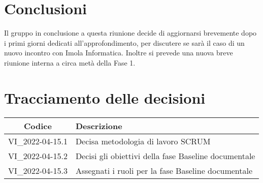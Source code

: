 \section{Conclusioni}
Il gruppo in conclusione a questa riunione decide di aggiornarsi brevemente dopo i primi giorni dedicati all'approfondimento, per discutere se sarà il caso di un nuovo incontro con Imola Informatica. Inoltre si prevede una nuova breve riunione interna a circa metà della Fase 1.
\newpage

\section*{Tracciamento delle decisioni}
	\renewcommand{\arraystretch}{1.8}
	\begin{tabular}{ |c|l| }
		\hline
		\textbf{Codice} & \textbf{Descrizione} \\
		\hline
		VI\_2022-04-15.1 & Decisa metodologia di lavoro SCRUM \\
		\hline
		VI\_2022-04-15.2 & Decisi gli obiettivi della fase Baseline documentale \\
		\hline
		VI\_2022-04-15.3 & Assegnati i ruoli per la fase Baseline documentale \\
		\hline
	\end{tabular}